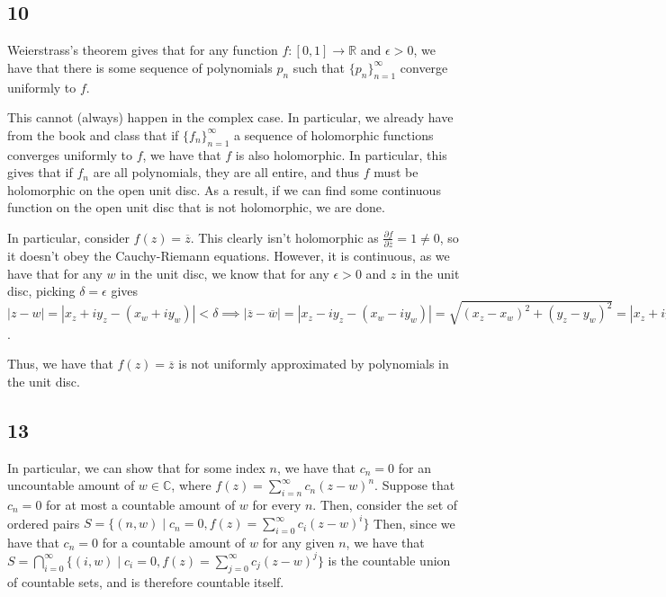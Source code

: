 \documentclass[12pt,letterpaper]{article}
\theoremstyle{definition}
\newcommand{\R}{\mathbb{R}}
\newcommand{\C}{\mathbb{C}}
\begin{document}
\subsection*{10}

Weierstrass's theorem gives that for any function $f: [0,1] \rightarrow \R$ and $\epsilon > 0$, we have that there is some sequence of polynomials $p_{n}$ such that $\{p_{n}\}_{n=1}^{\infty}$ converge uniformly to $f$.

This cannot (always) happen in the complex case. In particular, we already have from the book and class that if $\{f_{n}\}_{n=1}^{\infty}$ a sequence of holomorphic functions converges uniformly to $f$, we have that $f$ is also holomorphic. In particular, this gives that if $f_{n}$ are all polynomials, they are all entire, and thus $f$ must be holomorphic on the open unit disc. As a result, if we can find some continuous function on the open unit disc that is not holomorphic, we are done.

In particular, consider $f(z) = \overline{z}$. This clearly isn't holomorphic as $\frac{\partial f}{\partial \overline{z}} = 1 \neq 0$, so it doesn't obey the Cauchy-Riemann equations. However, it is continuous, as we have that for any $w$ in the unit disc, we know that for any $\epsilon > 0$ and $z$ in the unit disc, picking $\delta = \epsilon$ gives $|z - w| = |x_{z} + iy_{z} - (x_{w} + iy_{w})| < \delta \implies |\overline{z} - \overline{w}| = |x_{z} - iy_{z} - (x_{w} - iy_{w})| = \sqrt{(x_{z} - x_{w})^{2} + (y_{z} - y_{w})^{2}} = |x_{z} + iy_{z} - (x_{w} + iy_{w})| < \delta = \epsilon$.

Thus, we have that $f(z) = \overline{z}$ is not uniformly approximated by polynomials in the unit disc.

\subsection*{13}

In particular, we can show that for some index $n$, we have that $c_{n} = 0$ for an uncountable amount of $w \in \C$, where $f(z) = \sum_{i=n}^{\infty}c_{n}(z-w)^{n}$. Suppose that $c_{n} = 0$ for at most a countable amount of $w$ for every $n$. Then, consider the set of ordered pairs $S = \{(n, w) \mid c_{n} = 0, f(z) = \sum_{i=0}^{\infty}c_{i}(z-w)^{i}\}$ Then, since we have that $c_{n} = 0$ for a countable amount of $w$ for any given $n$, we have that $S = \bigcap_{i=0}^{\infty}\{(i, w) \mid c_{i} = 0, f(z) = \sum_{j=0}^{\infty}c_{j}(z-w)^{j}\}$ is the countable union of countable sets, and is therefore countable itself.
\end{document}
